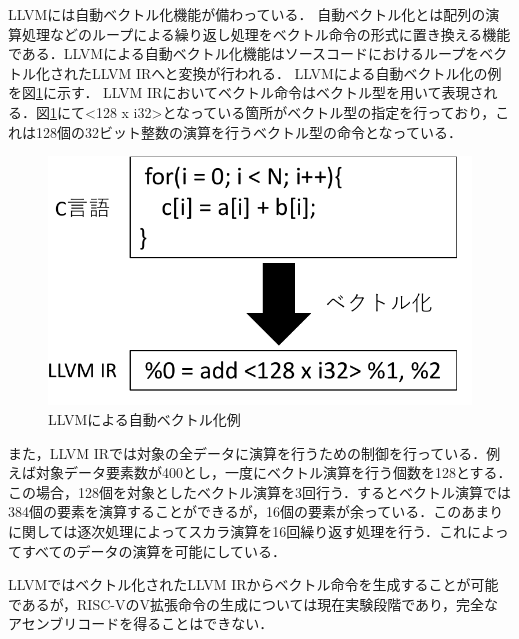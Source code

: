 
LLVMには自動ベクトル化機能が備わっている．
自動ベクトル化とは配列の演算処理などのループによる繰り返し処理をベクトル命令の形式に置き換える機能である．LLVMによる自動ベクトル化機能はソースコードにおけるループをベクトル化されたLLVM IRへと変換が行われる．
LLVMによる自動ベクトル化の例を図\ref{fig:LLVM_auto_vec}に示す．
LLVM IRにおいてベクトル命令はベクトル型を用いて表現される．図\ref{fig:LLVM_auto_vec}にて<128 x i32>となっている箇所がベクトル型の指定を行っており，これは128個の32ビット整数の演算を行うベクトル型の命令となっている．

\begin{figure}[b]
    \centering
    \includegraphics[scale=0.7]{image/Auto_vectorize.pdf}
    \caption{LLVMによる自動ベクトル化例}
    \label{fig:LLVM_auto_vec}
\end{figure}

また，LLVM IRでは対象の全データに演算を行うための制御を行っている．例えば対象データ要素数が400とし，一度にベクトル演算を行う個数を128とする．この場合，128個を対象としたベクトル演算を3回行う．するとベクトル演算では384個の要素を演算することができるが，16個の要素が余っている．このあまりに関しては逐次処理によってスカラ演算を16回繰り返す処理を行う．これによってすべてのデータの演算を可能にしている．

LLVMではベクトル化されたLLVM IRからベクトル命令を生成することが可能であるが，RISC-VのV拡張命令の生成については現在実験段階であり，完全なアセンブリコードを得ることはできない．